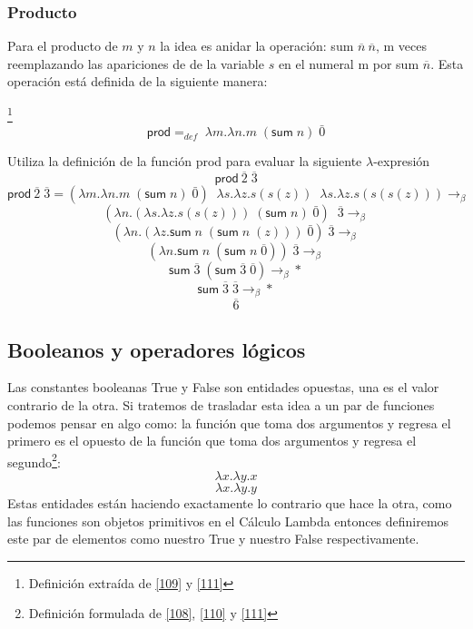         \subsubsection{Producto}
        Para el producto de $m$ y $n$ la idea es anidar la operación: \textsf{sum} $\overline{n}\ \overline{n}$, m veces reemplazando las apariciones de de la variable $s$ en el numeral m por \textsf{sum} $\overline{n}$. Esta operación está definida de la siguiente manera:

        \begin{definition}\footnote{Definición extraída de \hyperlink{109}{[109]} y  \hyperlink{111}{[111]}}
            $$\textsf{prod} =_{def}  \; \lambda m.\lambda n.m\; (\textsf{sum}\;n) \;  \bar{0}$$
        \end{definition}

        \begin{exercise}
            Utiliza la definición de la función \textsf{prod} para evaluar la siguiente  $\lambda$-expresión
            \[
                    \textsf{prod}\  \overline{2} \; \overline{3} 
            \]
           \[
			 \textsf{prod}\  \overline{2} \; \overline{3}  = (\lambda m.\lambda n.m\; (\textsf{sum}\;n) \;  \bar{0}) \;\; \lambda s. \lambda z.s(s(z)) \;\; \lambda s. \lambda z.s(s(s(z))) \rightarrow_\beta
	     \]
	     \[
			(\lambda n. ( \lambda s. \lambda z.s(s(z)))\; (\textsf{sum} \; n) \;  \bar{0}) \;\;  \overline{3}   \rightarrow_\beta
	     \]
	     \[
			(\lambda n. (\lambda z.\textsf{sum} \; n \; (\textsf{sum} \; n \; (z))) \;  \bar{0}) \;  \overline{3}  \rightarrow_\beta
	     \]
	     \[
			(\lambda n.\textsf{sum} \; n \; (\textsf{sum} \; n \; \overline{0}))\; \overline{3}  \rightarrow_\beta
	     \]
	     \[
	       	\textsf{sum} \; \overline{3} \; (\textsf{sum} \; \overline{3} \; \overline{0})  \rightarrow_\beta*
              \]
	     \[
	       	\textsf{sum} \; \overline{3} \; \overline{3}  \rightarrow_\beta*
              \]
	    \[
		\overline{6}
	    \]


        \end{exercise}

    \subsection{Booleanos y operadores lógicos}
    Las constantes booleanas \textsf{True} y \textsf{False} son entidades opuestas, una es el valor contrario de la otra. Si tratemos de trasladar esta idea a un par de funciones podemos pensar en algo como:
    la función que toma dos argumentos y regresa el primero es el opuesto de la función que toma dos argumentos y regresa el segundo\footnote{Definición formulada de \hyperlink{108}{[108]},  \hyperlink{110}{[110]} y  \hyperlink{111}{[111]}}:
    \[
        \lambda x.\lambda y.x
    \]
    \[
        \lambda x.\lambda y.y
    \]
    Estas entidades están haciendo exactamente lo contrario que hace la otra, como las funciones son objetos primitivos en el Cálculo Lambda entonces definiremos este par de elementos como nuestro \textsf{True} y nuestro \textsf{False} respectivamente.

